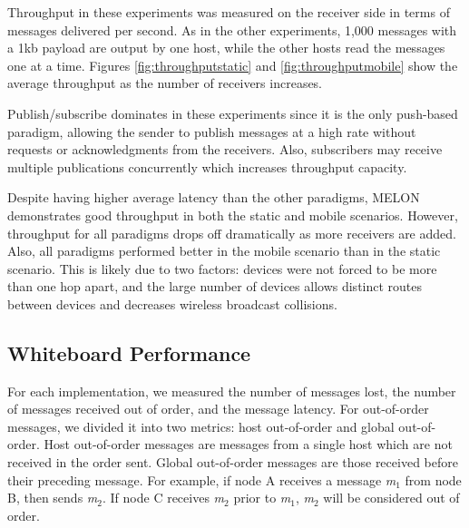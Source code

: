Throughput in these experiments was measured on the receiver side in terms of messages delivered per second. As in the other experiments, 1,000 messages with a 1kb payload are output by one host, while the other hosts read the messages one at a time. Figures \ref{fig:throughputstatic} and \ref{fig:throughputmobile} show the average throughput as the number of receivers increases.

Publish/subscribe dominates in these experiments since it is the only push-based paradigm, allowing the sender to publish messages at a high rate without requests or acknowledgments from the receivers. Also, subscribers may receive multiple publications concurrently which increases throughput capacity.

Despite having higher average latency than the other paradigms, MELON demonstrates good throughput in both the static and mobile scenarios. However, throughput for all paradigms drops off dramatically as more receivers are added. Also, all paradigms performed better in the mobile scenario than in the static scenario. This is likely due to two factors: devices were not forced to be more than one hop apart, and the large number of devices allows distinct routes between devices and decreases wireless broadcast collisions.


\subsection{Whiteboard Performance}

For each implementation, we measured the number of messages lost, the number of messages received out of order, and the message latency. For out-of-order messages, we divided it into two metrics: host out-of-order and global out-of-order. Host out-of-order messages are messages from a single host which are not received in the order sent. Global out-of-order messages are those received before their preceding message. For example, if node A receives a message \textit{m}$_{1}$ from node B, then sends \textit{m}$_{2}$. If node C receives \textit{m}$_{2}$ prior to \textit{m}$_{1}$, \textit{m}$_{2}$ will be considered out of order.

